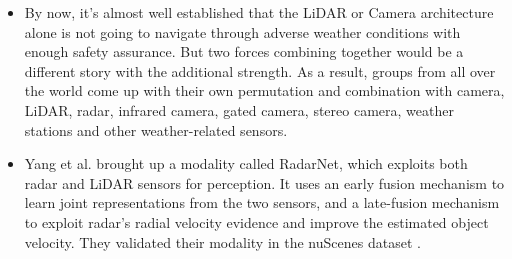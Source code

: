 \documentclass[rnd]{mas_proposal}
\begin{document}
\begin{itemize}
    
    
    \item By now, it’s almost well established that the LiDAR or Camera architecture alone is not going to navigate through adverse weather conditions with enough safety assurance. But two forces combining together would be a different story with the additional strength. As a result, groups from all over the world come up with their own permutation and combination with camera, LiDAR, radar, infrared camera, gated camera, stereo camera, weather stations and other weather-related sensors.
    
    \item Yang et al. \cite{yang2020radarnet} brought up a modality called RadarNet, which exploits both radar and LiDAR sensors for perception. It uses an early fusion mechanism to learn joint representations from the two sensors, and a late-fusion mechanism to exploit radar’s radial velocity evidence and improve the estimated object velocity. They validated their modality in the nuScenes dataset \cite{caesar2020nuscenes}.
    

\end{itemize}
\end{document}
